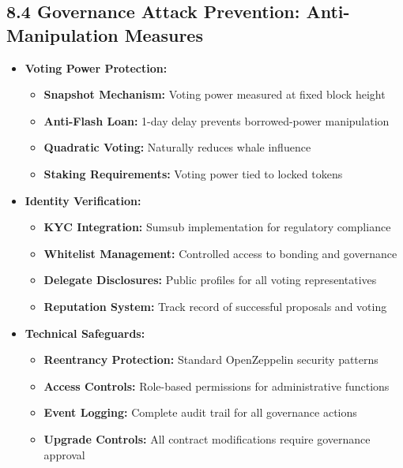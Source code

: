 \documentclass[
  paper=a4,
  ,captions=tableheading
]{scrartcl}
\providecommand{\tightlist}{%
  \setlength{\itemsep}{0pt}\setlength{\parskip}{0pt}}
\begin{document}
\subsection{8.4 Governance Attack Prevention: Anti-Manipulation
Measures}\label{governance-attack-prevention-anti-manipulation-measures}

\begin{itemize}
\tightlist
\item
  \textbf{Voting Power Protection:}

  \begin{itemize}
  \tightlist
  \item
    \textbf{Snapshot Mechanism:} Voting power measured at fixed block
    height
  \item
    \textbf{Anti-Flash Loan:} 1-day delay prevents borrowed-power
    manipulation
  \item
    \textbf{Quadratic Voting:} Naturally reduces whale influence
  \item
    \textbf{Staking Requirements:} Voting power tied to locked tokens
  \end{itemize}
\item
  \textbf{Identity Verification:}

  \begin{itemize}
  \tightlist
  \item
    \textbf{KYC Integration:} Sumsub implementation for regulatory
    compliance
  \item
    \textbf{Whitelist Management:} Controlled access to bonding and
    governance
  \item
    \textbf{Delegate Disclosures:} Public profiles for all voting
    representatives
  \item
    \textbf{Reputation System:} Track record of successful proposals and
    voting
  \end{itemize}
\item
  \textbf{Technical Safeguards:}

  \begin{itemize}
  \tightlist
  \item
    \textbf{Reentrancy Protection:} Standard OpenZeppelin security
    patterns
  \item
    \textbf{Access Controls:} Role-based permissions for administrative
    functions
  \item
    \textbf{Event Logging:} Complete audit trail for all governance
    actions
  \item
    \textbf{Upgrade Controls:} All contract modifications require
    governance approval
  \end{itemize}
\end{itemize}
\end{document}
